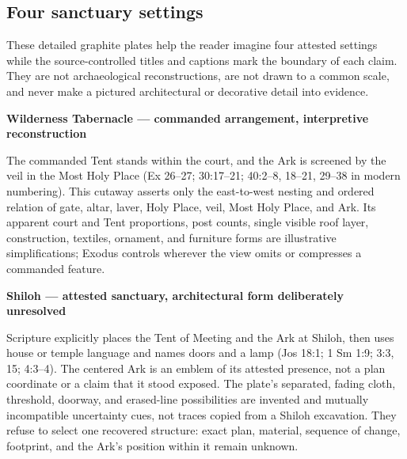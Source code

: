 \clearpage
\subsection{Four sanctuary settings}

These detailed graphite plates help the reader imagine four attested settings
while the source-controlled titles and captions mark the boundary of each
claim.  They are not archaeological reconstructions, are not drawn to a
common scale, and never make a pictured architectural or decorative detail
into evidence.

\begin{center}
{\bfseries Wilderness Tabernacle --- commanded arrangement, interpretive reconstruction\par}
\vspace{0.25em}

\begin{minipage}{0.91\linewidth}
\footnotesize
The commanded Tent stands within the court, and the Ark is screened by the
veil in the Most Holy Place (Ex 26--27; 30:17--21; 40:2--8, 18--21, 29--38 in
modern numbering).
This cutaway asserts only the east-to-west nesting and ordered relation of
gate, altar, laver, Holy Place, veil, Most Holy Place, and Ark.  Its apparent
court and Tent proportions, post counts, single visible roof layer,
construction, textiles, ornament, and furniture forms are illustrative
simplifications; Exodus controls wherever the view omits or compresses a
commanded feature.
\end{minipage}

\vspace{0.8em}
{\bfseries Shiloh --- attested sanctuary, architectural form deliberately unresolved\par}
\vspace{0.25em}

\begin{minipage}{0.91\linewidth}
\footnotesize
Scripture explicitly places the Tent of Meeting and the Ark at Shiloh, then
uses house or temple language and names doors and a lamp (Jos 18:1; 1 Sm 1:9;
3:3, 15; 4:3--4).  The centered Ark is an emblem of its attested presence,
not a plan coordinate or a claim that it stood exposed.  The plate's
separated, fading cloth, threshold, doorway, and erased-line possibilities are
invented and mutually incompatible uncertainty cues, not traces copied from a
Shiloh excavation.  They refuse to select one recovered structure: exact plan,
material, sequence of change, footprint, and the Ark's position within it
remain unknown.
\end{minipage}
\end{center}

